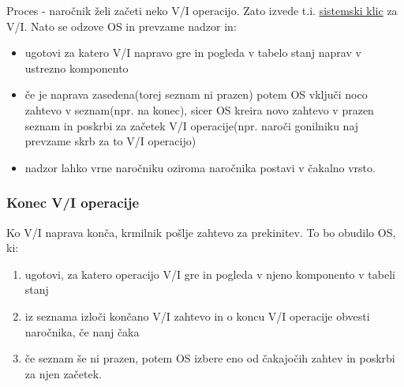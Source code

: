 \documentclass[
  slovene,
  a4paper
]{book}
\begin{document}
Proces - naročnik želi začeti neko V/I operacijo. Zato izvede t.i. \underline{sistemski klic} za V/I. Nato se odzove OS in prevzame nadzor in:

\begin{itemize}
  \item ugotovi za katero V/I napravo gre in pogleda v tabelo stanj naprav v ustrezno komponento
  \item če je naprava zasedena(torej seznam ni prazen) potem OS vključi noco zahtevo v seznam(npr. na konec), sicer OS kreira novo zahtevo v prazen seznam in poskrbi za začetek V/I operacije(npr. naroči gonilniku naj prevzame skrb za to V/I operacijo)
  \item nadzor lahko vrne naročniku oziroma naročnika postavi v čakalno vrsto.
\end{itemize}

\subsubsection{Konec V/I operacije}

Ko V/I naprava konča, krmilnik pošlje zahtevo za prekinitev. To bo obudilo OS, ki:
\begin{enumerate}
  \item ugotovi, za katero operacijo V/I gre in pogleda v njeno komponento v tabeli stanj
  \item iz seznama izloči končano V/I zahtevo in o koncu V/I operacije obvesti naročnika, če nanj čaka
  \item če seznam še ni prazen, potem OS izbere eno od čakajočih zahtev in poskrbi za njen začetek.
\end{enumerate}
\end{document}
